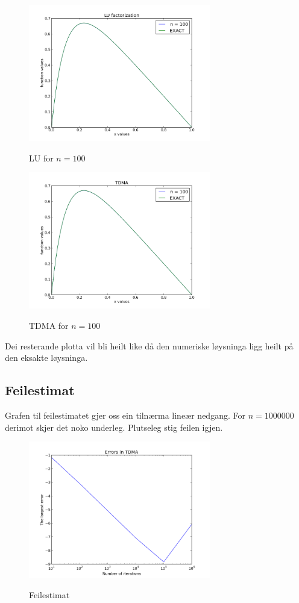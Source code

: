 \documentclass[11pt, a4paper]{article}
\begin{document}
    \begin{figure}
      \centering
      \includegraphics[width=300px]{LU100.png} \\
      \caption{LU for $n = 100$}
    \end{figure}
    \begin{figure}
      \centering
      \includegraphics[width=300px]{TDMA100.png} \\
      \caption{TDMA for $n = 100$}
    \end{figure}

    Dei resterande plotta vil bli heilt like då den numeriske løysninga ligg heilt på den 
    eksakte løysninga.

  \subsection{Feilestimat}
    Grafen til feilestimatet gjer oss ein tilnærma lineær nedgang. For $n = 1000000$ derimot skjer 
    det noko underleg. Plutseleg stig feilen igjen. 

    \begin{figure}
      \centering
      \includegraphics[width=300px]{ERROR.png} \\
      \caption{Feilestimat}
    \end{figure}
\end{document}
